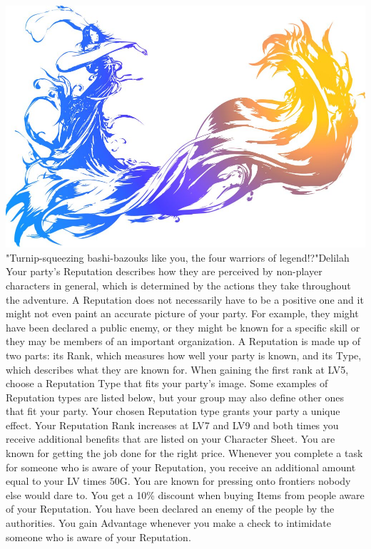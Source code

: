 %
\vfill
%
\includegraphics[width=\columnwidth]{./art/images/ff10.jpg}
%
\vfill
%
%
%
{"Turnip-squeezing bashi-bazouks like you, the four warriors of legend!?"}{Delilah}{
Your party's Reputation describes how they are perceived by non-player characters in general, which is determined by the actions they take throughout the adventure.
A Reputation does not necessarily have to be a positive one and it might not even paint an accurate picture of your party.
For example, they might have been declared a public enemy, or they might be known for a specific skill or they may be members of an important organization.
A Reputation is made up of two parts: its Rank, which measures how well your party is known, and its Type, which describes what they are known for.
When gaining the first rank at LV5, choose a Reputation Type that fits your party's image.
Some examples of Reputation types are listed below, but your group may also define other ones that fit your party.
Your chosen Reputation type grants your party a unique effect.
Your Reputation Rank increases at LV7 and LV9 and both times you receive additional benefits that are listed on your Character Sheet.}
%
\newpage
%
You are known for getting the job done for the right price. 
Whenever you complete a task for someone who is aware of your Reputation, you receive an additional amount equal to your LV times 50G.\ofrow
%
You are known for pressing onto frontiers nobody else would dare to. 
You get a 10\% discount when buying Items from people aware of your Reputation.\ofrow
%
You have been declared an enemy of the people by the authorities. 
You gain Advantage whenever you make a check to intimidate someone who is aware of your Reputation. \ofrow
